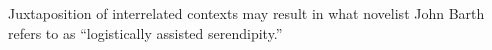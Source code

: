   Juxtaposition of interrelated contexts may result in what
   novelist John Barth \cite[p.~311]{barth1992last} refers to as
   ``logistically assisted serendipity.''







